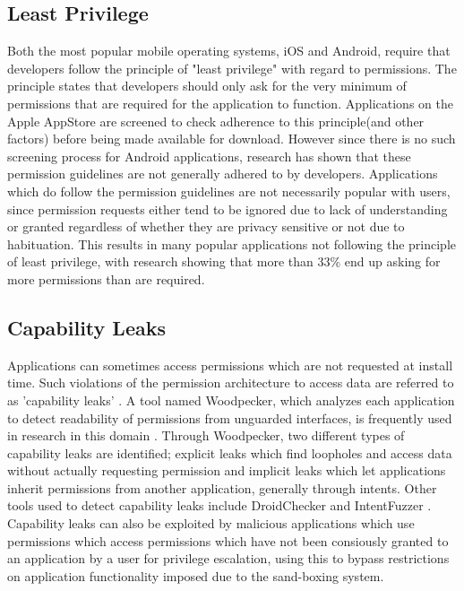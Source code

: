 \subsection{Least Privilege}
Both the most popular mobile operating systems, iOS and Android, require that developers follow the principle of "least privilege" with regard to permissions. The principle states that developers should only ask for the very minimum of permissions that are required for the application to function\cite{enck2009understanding}. Applications on the Apple AppStore are screened to check adherence to this principle(and other factors) before being made available for download\cite{gilbert2011vision}. However since there is no such screening process for Android applications, research has shown that these permission guidelines are not generally adhered to by developers\cite{stevens2013asking}. Applications which do follow the permission guidelines are not necessarily popular with users, since permission requests either tend to be ignored due to lack of understanding\cite{felt2011android} \cite{kelley2012conundrum} or granted regardless of whether they are privacy sensitive or not due to habituation\cite{felt2012android}. This results in many popular applications not following the principle of least privilege\cite{wei2012permission}, with research showing that more than 33\% end up asking for more permissions than are required\cite{felt2011android}.

\subsection{Capability Leaks}
Applications can sometimes access permissions which are not requested at install time. Such violations of the permission architecture to access data are referred to as 'capability leaks' \cite{grace2012systematic} \cite{grace2011detecting}. A tool named Woodpecker, which analyzes each application to detect readability of permissions from unguarded interfaces, is frequently used in research in this domain \cite{zhou2012hey}. Through Woodpecker, two different types of capability leaks are identified; explicit leaks which find loopholes and access data without actually requesting permission and implicit leaks which let applications inherit permissions from another application, generally through intents. Other tools used to detect capability leaks include DroidChecker and IntentFuzzer \cite{yang2014intentfuzzer} \cite{chan2012droidchecker}. Capability leaks can also be exploited by malicious applications which use permissions which access permissions which have not been consiously granted to an application by a user for privilege escalation, using this to bypass restrictions on application functionality imposed due to the sand-boxing system\cite{davi2010privilege}.  

